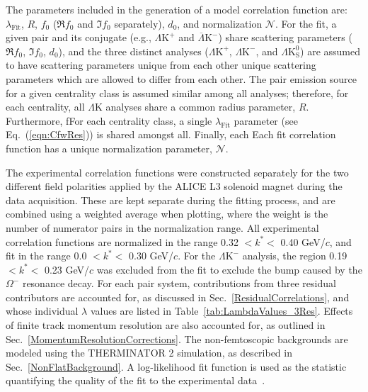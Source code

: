 \documentclass[ALICE,manyauthors]{cernphprep}
\newcommand{\LamK}{$\Lambda$K\xspace}
\newcommand{\LamKchP}{$\Lambda\mathrm{K^{+}}$\xspace}
\newcommand{\ALamKchM}{$\overline{\Lambda}\mathrm{K^{-}}$\xspace}
\newcommand{\LamKchM}{$\Lambda\mathrm{K^{-}}$\xspace}
\newcommand{\LamKs}{$\Lambda\mathrm{K^{0}_{S}}$\xspace}
\begin{document}
The parameters included in the generation of a {\color{blue}model} correlation function are: $\lambda_{\mathrm{Fit}}$, $R$, $f_{0}$ ($\Re f_{0}$ and $\Im f_{0}$ separately), $d_{0}$, and normalization $\mathcal{N}$.
For the fit, a given pair and its conjugate (e.g., \LamKchP and \ALamKchM) share scattering parameters ($\Re f_{0}$, $\Im f_{0}$, $d_{0}$), and the three distinct analyses (\LamKchP, \LamKchM, and \LamKs) are assumed to have {\color{red}scattering parameters unique from each other} {\color{blue}unique scattering parameters which are allowed to differ from each other.}
The pair emission source for a given centrality class is assumed similar among all analyses; therefore, for each centrality, all \LamK analyses share a common radius parameter{\color{blue}, $R$}.
{\color{blue}Furthermore, f}{\color{red}F}or each centrality class, a single $\lambda_{\mathrm{Fit}}$ parameter (see Eq.~{\color{blue}(}\ref{eqn:CfwRes}{\color{blue})}) is shared amongst all.
{\color{red}Finally, each} {\color{blue}Each fit} correlation function has a unique normalization parameter, $\mathcal{N}$.

{\color{blue}The experimental correlation functions were constructed separately for the two different field polarities applied by the ALICE L3 solenoid magnet during the data acquisition.
These are kept separate during the fitting process, and are combined using a weighted average when plotting, where the weight is the number of numerator pairs in the normalization range.}
All experimental correlation functions are normalized in the range 0.32 $< k^{*} <$ 0.40 GeV/$c$, and fit in the range 0.0 $< k^{*} <$ 0.30 GeV/$c$.
For the \LamKchM analysis, the region 0.19 $< k^{*} <$ 0.23 GeV/$c$ was excluded from the fit to exclude the bump caused by the $\Omega^{-}$ {\color{red}resonance} {\color{blue}decay}.
{\color{red}For each pair system, contributions from three residual contributors are accounted for, as discussed in Sec.~\ref{ResidualCorrelations}, and whose individual $\lambda$ values are listed in Table~\ref{tab:LambdaValues_3Res}.
Effects of finite track momentum resolution are also accounted for, as outlined in Sec.~\ref{MomentumResolutionCorrections}.
The non-femtoscopic backgrounds are modeled using the THERMINATOR 2 simulation, as described in Sec.~\ref{NonFlatBackground}.}
A log-likelihood fit function is used as the statistic quantifying the quality of the fit {\color{blue}to the experimental data~\cite{Lisa:2005dd}.}
\end{document}
